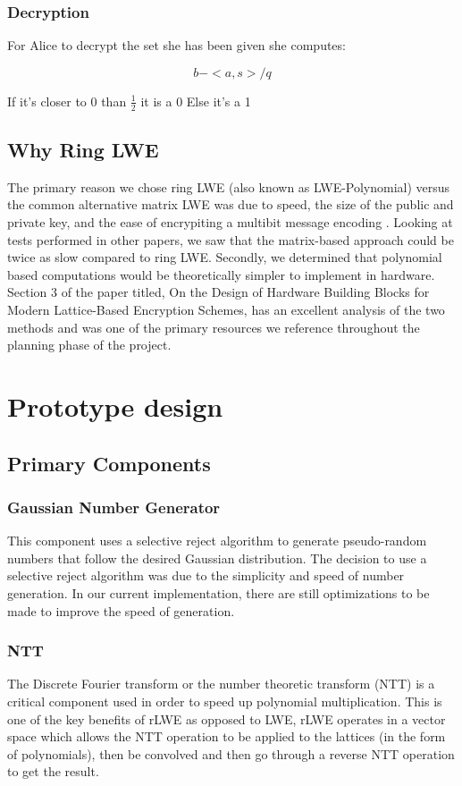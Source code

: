 \documentclass{article}
\begin{document}
\subsubsection{Decryption}
For Alice to decrypt the set she has been given she computes:

\begin{equation*}
b - <a,s>/q
\end{equation*}

If it’s closer to 0 than $\frac{1}{2}$ it is a 0
Else it’s a 1

\subsection{Why Ring LWE}
The primary reason we chose ring LWE (also known as LWE-Polynomial) versus the common alternative matrix LWE was due to speed, the size of the public and private key, and the ease of encrypiting a multibit message encoding \cite{cryptoeprint:2012:230}. Looking at tests performed in other papers, we saw that the matrix-based approach could be twice as slow compared to ring LWE. Secondly, we determined that polynomial based computations would be theoretically simpler to implement in hardware. Section 3 of the paper titled, On the Design of Hardware Building Blocks for Modern Lattice-Based Encryption Schemes, has an excellent analysis of the two methods and was one of the primary resources we reference throughout the planning phase of the project.
\section{Prototype design}
\subsection{Primary Components}
\subsubsection{Gaussian Number Generator}
This component uses a selective reject algorithm to generate pseudo-random numbers that follow the desired Gaussian distribution.  The decision to use a selective reject algorithm was due to the simplicity and speed of number generation. In our current implementation, there are still optimizations to be made to improve the speed of generation.  
\subsubsection{NTT}
The Discrete Fourier transform or the number theoretic transform (NTT) is a critical component used in order to speed up polynomial multiplication. This is one of the key benefits of rLWE as opposed to LWE, rLWE operates in a vector space which allows the NTT operation to be applied to the lattices (in the form of polynomials), then be convolved and then go through a reverse NTT operation to get the result. 
\end{document}
